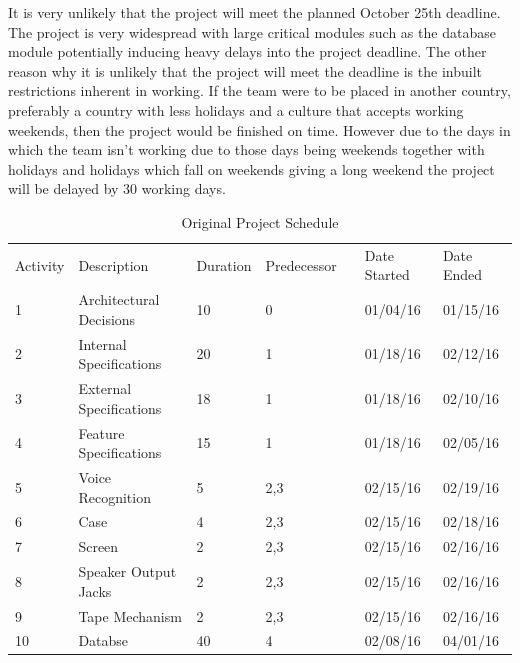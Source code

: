 \documentclass{article}
\begin{document}
It is very unlikely that the project will meet the planned  October 25th deadline. The project is very widespread with large critical modules such as the database module potentially inducing heavy delays into the project deadline. The other reason why it is unlikely that the project will meet the deadline is the inbuilt restrictions inherent in working. If the team were to be placed in another country, preferably a country with less holidays and a culture that accepts working weekends, then the project would be finished on time. However due to the days in which the team isn’t working due to those days being weekends together with holidays and holidays which fall on weekends giving a long weekend the project will be delayed by 30 working days.




\begin{table}[H]
\centering
\caption{Original Project Schedule}
\label{my-label}
\begin{tabular}{lllllll}
Activity & Description                   & Duration & Predecessor                 &  & Date Started & Date Ended \\
1        & Architectural Decisions       & 10       & 0                           &  & 01/04/16     & 01/15/16   \\
2        & Internal Specifications       & 20       & 1                           &  & 01/18/16     & 02/12/16   \\
3        & External Specifications       & 18       & 1                           &  & 01/18/16     & 02/10/16   \\
4        & Feature Specifications        & 15       & 1                           &  & 01/18/16     & 02/05/16   \\
5        & Voice Recognition             & 5        & 2,3                         &  & 02/15/16     & 02/19/16   \\
6        & Case                          & 4        & 2,3                         &  & 02/15/16     & 02/18/16   \\
7        & Screen                        & 2        & 2,3                         &  & 02/15/16     & 02/16/16   \\
8        & Speaker Output Jacks          & 2        & 2,3                         &  & 02/15/16     & 02/16/16   \\
9        & Tape Mechanism                & 2        & 2,3                         &  & 02/15/16     & 02/16/16   \\
10       & Databse                       & 40       & 4                           &  & 02/08/16     & 04/01/16   \\

\end{tabular}
\end{table}
\end{document}
